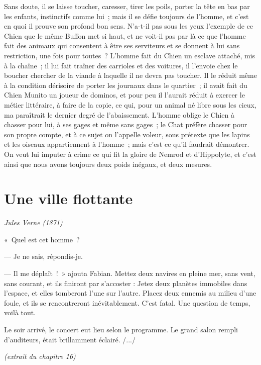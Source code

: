 \documentclass[openany]{book} %
\begin{document}
\bigskip 
Sans doute, il se laisse toucher, caresser, tirer les poils, porter la tête en bas par les enfants, instinctifs comme lui~; mais il se défie toujours de l'homme, et c'est en quoi il prouve son profond bon sens. N'a-t-il pas sous les yeux l'exemple de ce Chien que le même Buffon met si haut, et ne voit-il pas par là ce que l'homme fait des animaux qui consentent à être ses serviteurs et se donnent à lui sans restriction, une fois pour toutes~? L'homme fait du Chien un esclave attaché, mis à la chaîne~; il lui fait traîner des carrioles et des voitures, il l'envoie chez le boucher chercher de la viande à laquelle il ne devra pas toucher. Il le réduit même à la condition dérisoire de porter les journaux dans le quartier~; il avait fait du Chien Munito un joueur de dominos, et pour peu il l'aurait réduit à exercer le métier littéraire, à faire de la copie, ce qui, pour un animal né libre sous les cieux, ma paraîtrait le dernier degré de l'abaissement. L'homme oblige le Chien à chasser pour lui, à ses gages et même sans gages~; le Chat préfère chasser pour son propre compte, et à ce sujet on l'appelle voleur, sous prétexte que les lapins et les oiseaux appartiennent à l'homme~; mais c'est ce qu'il faudrait démontrer. On veut lui imputer à crime ce qui fit la gloire de Nemrod et d'Hippolyte, et c'est ainsi que nous avons toujours deux poids inégaux, et deux mesures.

\parag 

\hypertarget{toc14}{}
\pagebreak[\PAGExSUBxBREAKxPOLICY]
\section{Une ville flottante}

\textit{Jules Verne (1871)}

«~Quel est cet homme~?

— Je ne sais, répondis-je.

--- Il me déplaît~!~» ajouta Fabian. Mettez deux navires en pleine mer, sans vent, sans courant, et ils finiront par s’accoster : Jetez deux planètes immobiles dans l’espace, et elles tomberont l’une sur l’autre. Placez deux ennemis au milieu d’une foule, et ils se rencontreront inévitablement. C’est fatal. Une question de temps, voilà tout. 

Le soir arrivé, le concert eut lieu selon le programme. Le grand salon rempli d’auditeurs, était brillamment éclairé. /.../

\textit{(extrait du chapitre 16)}

\hypertarget{toc15}{}
\pagebreak[\PAGExSUBxBREAKxPOLICY]
\end{document}
